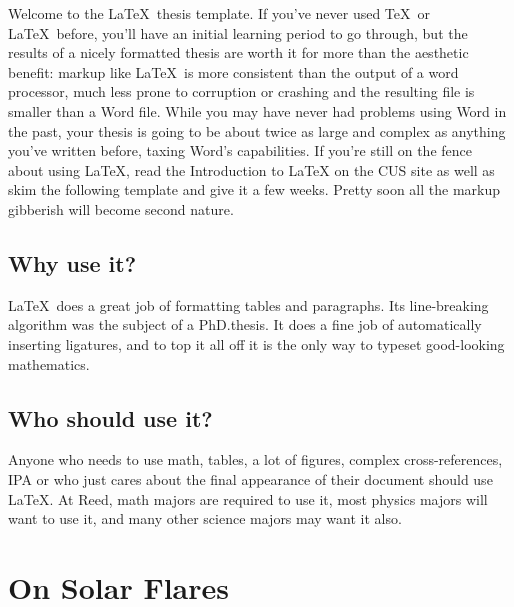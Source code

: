 \documentclass[12pt,twoside]{reedthesis}
\begin{document}
	Welcome to the \LaTeX\ thesis template. If you've never used \TeX\ or \LaTeX\ before, you'll have an initial learning period to go through, but the results of a nicely formatted thesis are worth it for more than the aesthetic benefit: markup like \LaTeX\ is more consistent than the output of a word processor, much less prone to corruption or crashing and the resulting file is smaller than a Word file. While you may have never had problems using Word in the past, your thesis is going to be about twice as large and complex as anything you've written before, taxing Word's capabilities. If you're still on the fence about  using \LaTeX, read the Introduction to LaTeX on the CUS site as well as skim the following template and give it a few weeks. Pretty soon all the markup gibberish will become second nature.

\section{Why use it?}
	
\LaTeX\ does a great job of formatting tables and paragraphs. Its line-breaking algorithm was the subject of a PhD.\thinspace thesis. It does a fine job of automatically inserting ligatures, and to top it all off it is the only way to typeset good-looking mathematics.

\section{Who should use it?}

Anyone who needs to use math, tables, a lot of figures, complex cross-references, IPA or who just cares about the final appearance of their document should use \LaTeX. At Reed, math majors are required to use it, most physics majors will want to use it, and many other science majors may want it also.


	
\chapter{On Solar Flares}
  
\end{document}
